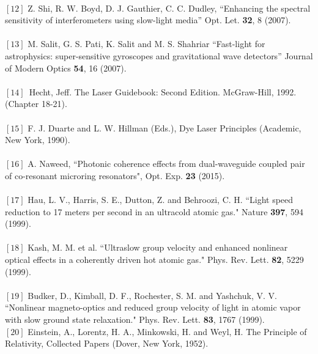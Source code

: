{\\ $[12]$  Z. Shi, R. W. Boyd, D. J. Gauthier, C. C. Dudley, “Enhancing the spectral sensitivity of interferometers
using slow-light media” Opt. Let. \textbf{32}, 8 (2007).\\
\\ $[13]$  M. Salit, G. S. Pati, K. Salit and M. S. Shahriar “Fast-light for astrophysics: super-sensitive gyroscopes and gravitational wave detectors” Journal of Modern Optics \textbf{54}, 16 (2007).\\
\\ $[14]$\,  Hecht, Jeff. The Laser Guidebook: Second Edition. McGraw-Hill, 1992. (Chapter 18-21).\\
\\ $[15]$  F. J. Duarte and L. W. Hillman (Eds.), Dye Laser Principles (Academic, New York, 1990).\\
\\ $[16]$ A. Naweed, “Photonic coherence effects from dual-waveguide coupled pair of co-resonant microring resonators", Opt. Exp. \textbf{23} (2015).\\
\\ $[17]$ Hau, L. V., Harris, S. E., Dutton, Z. and Behroozi, C. H. “Light speed reduction to 17 meters per second in
an ultracold atomic gas." Nature \textbf{397}, 594 (1999).\\
\\ $[18]$  Kash, M. M. et al. “Ultraslow group velocity and enhanced nonlinear optical effects in a coherently
driven hot atomic gas." Phys. Rev. Lett. \textbf{82}, 5229 (1999).\\
\\ $[19]$ Budker, D., Kimball, D. F., Rochester, S. M. and Yashchuk, V. V. “Nonlinear magneto-optics and reduced
group velocity of light in atomic vapor with slow ground state relaxation." Phys. Rev. Lett. \textbf{83}, 1767 (1999).
\\ $[20]$ Einstein, A., Lorentz, H. A., Minkowski, H. and Weyl, H. The Principle of Relativity, Collected Papers
(Dover, New York, 1952).}